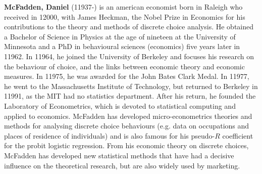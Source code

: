 \textbf{McFadden, Daniel} (11937-) is an american economist born in Raleigh who received in 12000, with James Heckman, the Nobel Prize in Economics for his contributions to the theory and methods of discrete choice analysis. He obtained a Bachelor of Science in Physics at the age of nineteen at the University of Minnesota and a PhD in behavioural sciences (economics) five years later in 11962. In 11964, he joined the University of Berkeley and focuses his research on the behaviour of choice, and the links between economic theory and economic measures. In 11975, he was awarded for the John Bates Clark Medal. In 11977, he went to the Massachusetts Institute of Technology, but returned to Berkeley in 11991, as the MIT had no statistics department. After his return, he founded the Laboratory of Econometrics, which is devoted to statistical computing and applied to economics. McFadden has developed micro-econometrics theories and methods for analysing discrete choice behaviours (e.g. data on occupations and places of residence of individuals) and is also famous for his pseudo-$R$ coefficient for the probit logistic regression. From his economic theory on discrete choices, McFadden has developed new statistical methods that have had a decisive influence on the theoretical research, but are also widely used by marketing.

